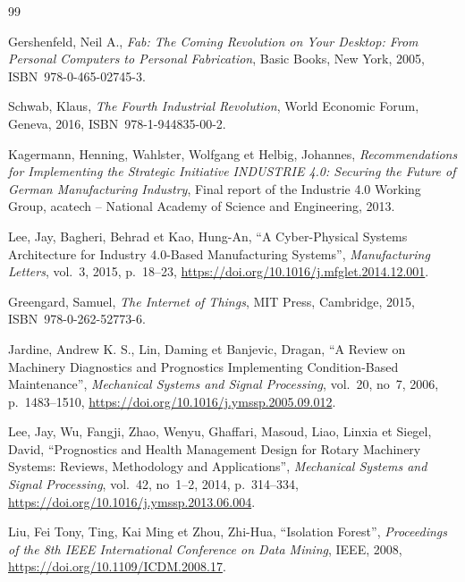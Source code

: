 \documentclass[12pt,a4paper]{report}
\begin{document}
\clearpage
\renewcommand{\bibname}{Bibliographie et webographie}
\begin{thebibliography}{99}

Gershenfeld, Neil A.,
\textit{Fab: The Coming Revolution on Your Desktop: From Personal Computers to Personal Fabrication},
Basic Books, New York, 2005, ISBN~978-0-465-02745-3.

Schwab, Klaus,
\textit{The Fourth Industrial Revolution},
World Economic Forum, Geneva, 2016, ISBN~978-1-944835-00-2.

Kagermann, Henning, Wahlster, Wolfgang et Helbig, Johannes,
\textit{Recommendations for Implementing the Strategic Initiative INDUSTRIE 4.0: Securing the Future of German Manufacturing Industry},
Final report of the Industrie 4.0 Working Group, acatech -- National Academy of Science and Engineering, 2013.

Lee, Jay, Bagheri, Behrad et Kao, Hung-An,
``A Cyber-Physical Systems Architecture for Industry 4.0-Based Manufacturing Systems'',
\textit{Manufacturing Letters}, vol.~3, 2015, p.~18--23,
\url{https://doi.org/10.1016/j.mfglet.2014.12.001}.

Greengard, Samuel,
\textit{The Internet of Things},
MIT Press, Cambridge, 2015, ISBN~978-0-262-52773-6.

Jardine, Andrew K. S., Lin, Daming et Banjevic, Dragan,
``A Review on Machinery Diagnostics and Prognostics Implementing Condition-Based Maintenance'',
\textit{Mechanical Systems and Signal Processing}, vol.~20, no~7, 2006, p.~1483--1510,
\url{https://doi.org/10.1016/j.ymssp.2005.09.012}.

Lee, Jay, Wu, Fangji, Zhao, Wenyu, Ghaffari, Masoud, Liao, Linxia et Siegel, David,
``Prognostics and Health Management Design for Rotary Machinery Systems: Reviews, Methodology and Applications'',
\textit{Mechanical Systems and Signal Processing}, vol.~42, no~1--2, 2014, p.~314--334,
\url{https://doi.org/10.1016/j.ymssp.2013.06.004}.

Liu, Fei Tony, Ting, Kai Ming et Zhou, Zhi-Hua,
``Isolation Forest'',
\textit{Proceedings of the 8th IEEE International Conference on Data Mining}, IEEE, 2008,
\url{https://doi.org/10.1109/ICDM.2008.17}.


\end{thebibliography}
\end{document}
